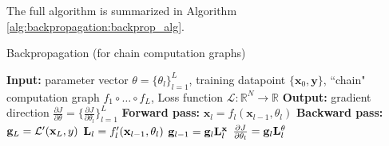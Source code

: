 The full algorithm is summarized in Algorithm \ref{alg:backpropagation:backprop_alg}. %

\begin{algorithm}[h]
\label{gradient_descent}
\SetAlgoVlined
\DontPrintSemicolon
\caption{Backpropagation (for chain computation graphs)}
{\bf Input:} parameter vector $\theta = \{\theta_l\}_{l=1}^L$, training datapoint $\{\mathbf{x}_0,\mathbf{y}\}$, ``chain" computation graph $f_1 \circ \ldots \circ f_L$, Loss function $\mathcal{L}: \mathbb{R}^N \rightarrow \mathbb{R}$\;
{\bf Output:} gradient direction $\frac{\partial J}{\partial \theta} = \{\frac{\partial J}{\partial \theta_l}\}_{l=1}^L$ \;
\;
\textbf{Forward pass:}\;
 {
    $\mathbf{x}_l = f_l(\mathbf{x}_{l-1}, \theta_l)$\;
}
\;
\textbf{Backward pass:}\;
$\mathbf{g}_L = \mathcal{L}^{\prime}(\mathbf{x}_L,y)$\;
 {
    $\mathbf{L}_{l} = f_l^{\prime}(\mathbf{x}_{l-1},\theta_l)$\;
    $\mathbf{g}_{l-1} = \mathbf{g}_{l}\mathbf{L}^{\mathbf{x}}_{l}$\;
    $\frac{\partial J}{\partial \theta_l} = \mathbf{g}_{l}\mathbf{L}^{\theta}_{l}$\;
}
\label{alg:backpropagation:backprop_for_chains}
\end{algorithm}

